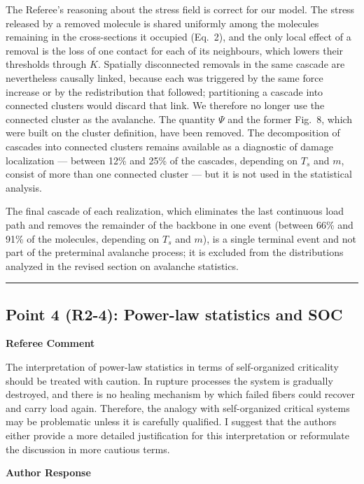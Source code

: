 \documentclass[11pt]{article}
\newenvironment{refereecomment}
  {%
    \par
    \begingroup
    \color{commentgray}
    \itshape
    \setlength{\leftskip}{1.4em}
    \setlength{\rightskip}{1.4em}
  }
  {%
    \par
    \endgroup
  }
\newcommand{\refereelabel}{%
  \par\smallskip
  {\color{commentgray}\bfseries Referee Comment}\par
}
\newcommand{\responselabel}{%
  \par\medskip
  {\color{responseblue}\bfseries Author Response}\par
}
\newcommand{\pointseparator}{%
  \par\bigskip
  {\color{rulegray}\hrule}
  \par\bigskip
}
\begin{document}
The Referee's reasoning about the stress field is correct for our model. The
stress released by a removed molecule is shared uniformly among the molecules
remaining in the cross-sections it occupied (Eq.~2), and the only local effect
of a removal is the loss of one contact for each of its neighbours, which lowers
their thresholds through $K$. Spatially disconnected removals in the same
cascade are nevertheless causally linked, because each was triggered by the same
force increase or by the redistribution that followed; partitioning a cascade
into connected clusters would discard that link. We therefore no longer use the
connected cluster as the avalanche. The quantity $\Psi$ and the former Fig.~8,
which were built on the cluster definition, have been removed. The decomposition
of cascades into connected clusters remains available as a diagnostic of damage
localization --- between 12\% and 25\% of the cascades, depending on $T_s$ and
$m$, consist of more than one connected cluster --- but it is not used in the
statistical analysis.

The final cascade of each realization, which eliminates the last continuous load
path and removes the remainder of the backbone in one event (between 66\% and
91\% of the molecules, depending on $T_s$ and $m$), is a single terminal event
and not part of the preterminal avalanche process; it is excluded from the
distributions analyzed in the revised section on avalanche statistics.


\pointseparator


\subsection*{Point 4 (R2-4): Power-law statistics and SOC}

\refereelabel
\begin{refereecomment}
  The interpretation of power-law statistics in terms of self-organized
  criticality should be treated with caution. In rupture processes the system is
  gradually destroyed, and there is no healing mechanism by which failed fibers
  could recover and carry load again. Therefore, the analogy with self-organized
  critical systems may be problematic unless it is carefully qualified. I
  suggest that the authors either provide a more detailed justification for this
  interpretation or reformulate the discussion in more cautious terms.
\end{refereecomment}

\responselabel
\end{document}
